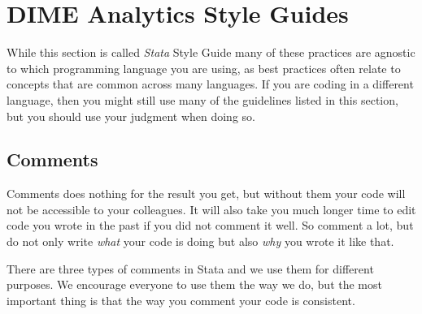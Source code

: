 \section{DIME Analytics Style Guides}

While this section is called \textit{Stata} Style Guide many of these practices are agnostic to which 
programming language you are using, as best practices often relate to concepts that are common across many 
languages. If you are coding in a different language, then you might still use many of the guidelines 
listed in this section, but you should use your judgment when doing so.

\subsection{Comments}

Comments does nothing for the result you get, but without them your code will not be accessible to your colleagues. It will also take you much longer time to edit code you wrote in the past if you did not comment it well. So comment a lot, but do not only write \textit{what} your code is doing but also \textit{why} you wrote it like that.

There are three types of comments in Stata and we use them for different purposes. We encourage everyone to use them the way we do, but the most important thing is that the way you comment your code is consistent.



\mainmatter
